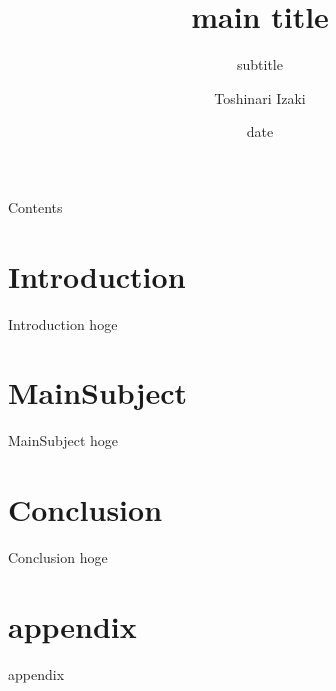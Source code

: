 \documentclass[aspectratio=169, dvipdfmx, 12pt]{beamer}
\title[title]{main title}
\subtitle{subtitle}
\author{Toshinari Izaki}
\institute{University of Hyogo}
\date{date}
\begin{document}
\maketitle


\begin{frame}{Contents}
\tableofcontents
\end{frame}

\section{Introduction}
\begin{frame}{Introduction}
    hoge
\end{frame}

\section{MainSubject}
\begin{frame}{MainSubject}
    hoge
\end{frame}

\section{Conclusion}
\begin{frame}{Conclusion}
    hoge
\end{frame}



\appendix
\section{appendix}
\begin{frame}{appendix}
\end{frame}
\end{document}
